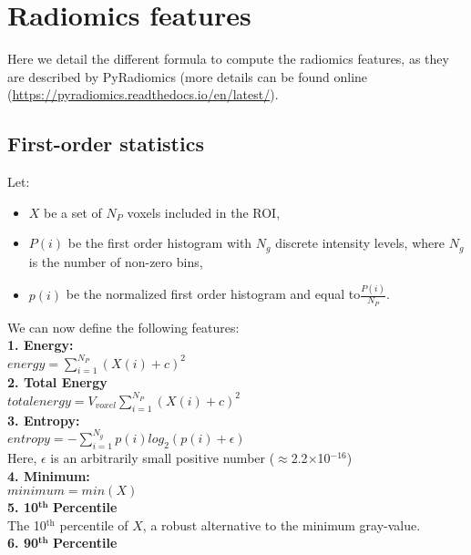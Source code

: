 \chapter{Radiomics features}\label{appendix---radiomicsFeatures}

Here we detail the different formula to compute the radiomics features, as they are described by PyRadiomics (more details can be found online (\url{https://pyradiomics.readthedocs.io/en/latest/}).

\newcommand*\mean[1]{\overline{#1}}

\section{First-order statistics}

Let:
\begin{itemize}
\item $X$ be a set of $N_{P}$ voxels included in the ROI,
\item 
 $P\left(i\right)$ be the first order histogram with $N_{g}$ discrete intensity levels, where $N_{g}$ is the number of non-zero bins,
\item $p\left(i\right)$ be the normalized first order histogram and equal to$\frac{P\left(i\right)}{N_{P}}$.
\end{itemize}
We can now define the following features: \\
\textbf{1. Energy:}\\
$\textit{energy}=\sum _{i=1}^{N_{P}}\left(X\left(i\right)+c\right)^{2}$\\
\textbf{2. Total Energy}\\
$\textit{totalenergy}=V_{\textit{voxel}}\sum _{i=1}^{N_{P}}\left(X\left(i\right)+c\right)^{2}$ \\
\textbf{3. Entropy:}\\
$\textit{entropy}=-\sum _{i=1}^{N_{g}}p\left(i\right)log_{2}\left(p\left(i\right)+\epsilon \right)$ \\
Here, $\epsilon $ is an arbitrarily small positive number (${\approx}$2.2${\times}$10$^{-16}$) \\
\textbf{4. Minimum:}\\
$\textit{minimum}=min \left(X\right)$\\
\textbf{5. 10}$^{\mathbf{th}}$ \textbf{Percentile}\\
The 10$^{\mathrm{th}}$ percentile of $X$, a robust alternative to the minimum gray-value.\\
\textbf{6. 90}$^{\mathbf{th}}$ \textbf{Percentile}\\
